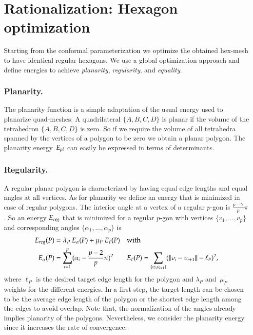 \documentclass[article.tex]{subfiles}
\begin{document}
\newcommand{\Ealpha}{E_\alpha}
\newcommand{\Eedge}{E_\ell}

\section{Rationalization: Hexagon optimization}
\label{sec:regular_hexagons}

Starting from the conformal parameterization we optimize the obtained
hex-mesh to have identical regular hexagons. We use a global
optimization approach and define energies to achieve \emph{planarity},
\emph{regularity}, and \emph{equality}.

\subsubsection{Planarity.} 
The planarity function is a simple adaptation of the usual energy used
to planarize quad-meshes: A quadrilateral $\{A, B, C, D\}$ is planar
if the volume of the tetrahedron $\{A, B, C, D\}$ is zero. So if we
require the volume of all tetrahedra spanned by the vertices of a polygon
to be zero we obtain a planar polygon.  The planarity energy~$E_{pl}$
can easily be expressed in terms of determinants.

\subsubsection{Regularity.}
A regular planar polygon is characterized by having equal edge lengths
and equal angles at all vertices. As for planarity we define an energy
that is minimized in case of regular polygons. The interior angle at a
vertex of a regular $p$-gon is $\tfrac{p-2}{p} \pi$. So an energy $E_{reg}$
that is minimized for a regular $p$-gon with vertices $\{v_1, \ldots,
v_p\}$ and corresponding angles $\{\alpha_1, \ldots, \alpha_p\}$ is
\begin{align*}
\Ereg(P) &= \lambda_P\  \Ealpha(P) + \mu_P\ \Eedge(P) &&\text{with}\\ 
\Ealpha(P) &= \sum_{i=1}^p (\alpha_i - \frac{p-2}{p} \pi)^2 
&& \Eedge(P) = \sum_{(v_i,v_{i+1})} (\|v_i - v_{i+1}\| - \ell_P)^2,
\end{align*}
where $\ell_P$ is the desired target edge length for the polygon and
$\lambda_P$ and~$\mu_P$ weights for the different energies. In a first
step, the target length can be chosen to be the average edge length of
the polygon or the shortest edge length among the edges to avoid
overlap.  Note that, the normalization of the angles already implies
planarity of the polygons.  Nevertheless, we consider the planarity
energy since it increases the rate of convergence.
\end{document}
